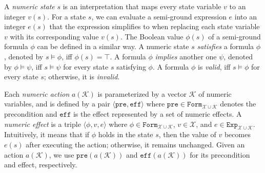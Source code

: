 \documentclass[review]{elsarticle}
\newcommand{\Exp}{\mathtt{Exp}}
\newcommand{\formula}{\mathtt{Form}}
\newcommand{\tuple}[1]{\langle {#1} \rangle}
\newcommand{\true}{\top}
\newcommand{\statevar}{\mathcal{X}}
\newcommand{\parmset}{\mathcal{K}}
\newcommand{\pre}{\mathtt{pre}}
\newcommand{\eff}{\mathtt{eff}}
\newcommand{\con}{\phi}
\begin{document}
	
	A \textit{numeric state} $s$ is an interpretation that maps every state variable $v$ to an integer $v(s)$.
	For a state $s$, we can evaluate a semi-ground expression $e$ into an integer $e(s)$ that the expression simplifies to when replacing each state variable $v$ with its corresponding value $v(s)$.	
	The Boolean value $\phi(s)$ of a semi-ground formula $\phi$ can be defined in a similar way.
	A numeric state $s$ \textit{satisfies} a formula $\phi$, denoted by $s \models \phi$, iff $\phi(s) = \true$.
	A formula $\phi$ \textit{implies} another one $\psi$, denoted by $\phi \models \psi$, iff $s \models \psi$ for every state $s$ satisfying $\phi$.
	A formula $\phi$ is \textit{valid}, iff $s \models \phi$ for every state $s$; otherwise, it is \textit{invalid}.
	
	Each \textit{numeric action} $a(\parmset)$ is parameterized by a vector $\parmset$ of numeric variables, and is defined by a pair $\tuple{\pre, \eff}$ where $\pre \in \formula_{\statevar \cup \parmset}$ denotes the precondition and $\eff$ is the effect represented by a set of numeric effects.
	A \textit{numeric effect} is a triple $\tuple{\con, v, e}$ where $\con \in \formula_{\statevar \cup \parmset}$, $v \in \statevar$, and $e \in \Exp_{\statevar \cup \parmset}$.
	Intuitively, it means that if $\con$ holds in the state $s$, then the value of $v$ becomes $e(s)$ after executing the action; otherwise, it remains unchanged.
	Given an action $a(\parmset)$, we use $\pre(a(\parmset))$ and $\eff(a(\parmset))$ for its precondition and effect, respectively.
	
\end{document}
